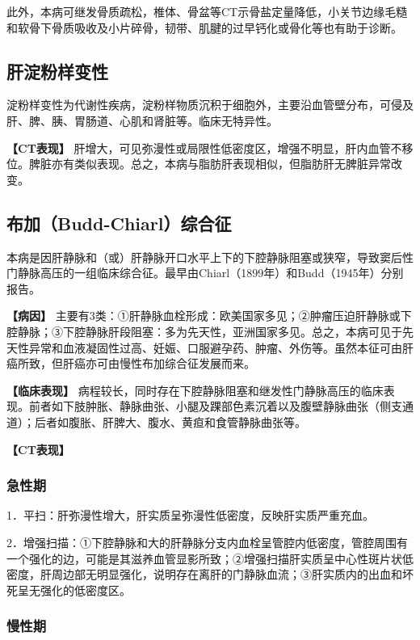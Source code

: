 此外，本病可继发骨质疏松，椎体、骨盆等CT示骨盐定量降低，小关节边缘毛糙和软骨下骨质吸收及小片碎骨，韧带、肌腱的过早钙化或骨化等也有助于诊断。

\subsection{肝淀粉样变性}

淀粉样变性为代谢性疾病，淀粉样物质沉积于细胞外，主要沿血管壁分布，可侵及肝、脾、胰、胃肠道、心肌和肾脏等。临床无特异性。

\textbf{【CT表现】}
肝增大，可见弥漫性或局限性低密度区，增强不明显，肝内血管不移位。脾脏亦有类似表现。总之，本病与脂肪肝表现相似，但脂肪肝无脾脏异常改变。

\subsection{布加（Budd-Chiarl）综合征}

本病是因肝静脉和（或）肝静脉开口水平上下的下腔静脉阻塞或狭窄，导致窦后性门静脉高压的一组临床综合征。最早由Chiarl（1899年）和Budd（1945年）分别报告。

\textbf{【病因】}
主要有3类：①肝静脉血栓形成：欧美国家多见；②肿瘤压迫肝静脉或下腔静脉；③下腔静脉肝段阻塞：多为先天性，亚洲国家多见。总之，本病可见于先天性异常和血液凝固性过高、妊娠、口服避孕药、肿瘤、外伤等。虽然本征可由肝癌所致，但肝癌亦可由慢性布加综合征发展而来。

\textbf{【临床表现】}
病程较长，同时存在下腔静脉阻塞和继发性门静脉高压的临床表现。前者如下肢肿胀、静脉曲张、小腿及踝部色素沉着以及腹壁静脉曲张（侧支通道）；后者如腹胀、肝脾大、腹水、黄疸和食管静脉曲张等。

\textbf{【CT表现】}

\subsubsection{急性期}

1．平扫：肝弥漫性增大，肝实质呈弥漫性低密度，反映肝实质严重充血。

2．增强扫描：①下腔静脉和大的肝静脉分支内血栓呈管腔内低密度，管腔周围有一个强化的边，可能是其滋养血管显影所致；②增强扫描肝实质呈中心性斑片状低密度，肝周边部无明显强化，说明存在离肝的门静脉血流；③肝实质内的出血和坏死呈无强化的低密度区。

\subsubsection{慢性期}

